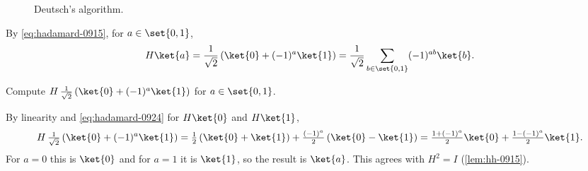 \begin{figure}[ht]
    \centering
    \caption{Deutsch's algorithm.}
    \label{fig:deutsch-0924}
\end{figure}

By \cref{eq:hadamard-0915}, for $a \in \set{0,1}$,
\begin{equation}\label{eq:hadamard-0924}
    H\ket{a} = \frac{1}{\sqrt{2}}\left(\ket{0} + (-1)^{a}\ket{1}\right)
    = \frac{1}{\sqrt{2}} \sum_{b \in \set{0,1}} (-1)^{ab} \ket{b}.
\end{equation}

\begin{exercisebox}
\begin{exercise}\label{ex:hback-0924}
    Compute $H \, \frac{1}{\sqrt{2}}\left(\ket{0} + (-1)^{a}\ket{1}\right)$ for $a \in \set{0,1}$.
\end{exercise}
\tcblower
\begin{wsolution}
    By linearity and \cref{eq:hadamard-0924} for $H\ket{0}$ and $H\ket{1}$,
    \[H \, \tfrac{1}{\sqrt{2}}\left(\ket{0} + (-1)^{a}\ket{1}\right)
        = \tfrac{1}{2}\left(\ket{0} + \ket{1}\right) + \tfrac{(-1)^{a}}{2}\left(\ket{0} - \ket{1}\right)
        = \tfrac{1 + (-1)^{a}}{2}\ket{0} + \tfrac{1 - (-1)^{a}}{2}\ket{1}.\]
    For $a = 0$ this is $\ket{0}$ and for $a = 1$ it is $\ket{1}$, so the result is $\ket{a}$. This
    agrees with $H^2 = I$ (\cref{lem:hh-0915}).
\end{wsolution}
\end{exercisebox}

